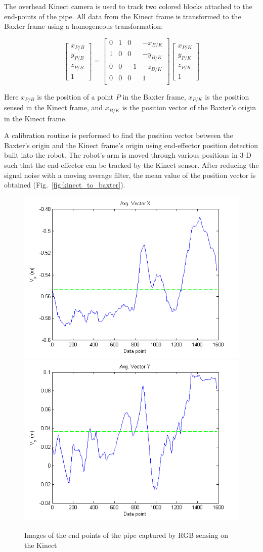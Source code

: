 \documentclass[runningheads,letterpaper]{llncs}
\begin{document}
The overhead Kinect camera is used to track two colored blocks attached to the end-points of the pipe. All data from the Kinect frame is transformed to the Baxter frame using a homogeneous transformation:

\begin{equation}
\left[ \begin{array}{c} x_{P/B} \\ y_{P/B} \\ z_{P/B} \\ 1 \end{array} \right] = \begin{bmatrix} 0 & 1 & 0 & -x_{B/K} \\ 1 & 0 & 0 & -y_{B/K} \\ 0 & 0 & -1 & -z_{B/K} \\ 0 & 0 & 0 & 1 \\ \end{bmatrix} \left[ \begin{array}{c} x_{P/K} \\ y_{P/K} \\ z_{P/K} \\ 1 \end{array} \right]
\end{equation}

Here $x_{P/B}$ is the position of a point $P$ in the Baxter frame, $x_{P/K}$ is the position sensed in the Kinect frame, and $x_{B/K}$ is the position vector of the Baxter's origin in the Kinect frame.

A calibration routine is performed to find the position vector between the Baxter's origin and the Kinect frame's origin using end-effector position detection built into the robot. The robot's arm is moved through various positions in 3-D such that the end-effector can be tracked by the Kinect sensor. After reducing the signal noise with a moving average filter, the mean value of the position vector is obtained (Fig.~\ref{fig:kinect_to_baxter}).

\begin{figure}[ht]
\centering
	\includegraphics[height=0.3\columnwidth]{images/vec_avg_x.png}
	\includegraphics[height=0.3\columnwidth]{images/vec_avg_y.png}	
\caption{Images of the end points of the pipe captured by RGB sensing on the Kinect}
\label{fig:kinect_rgb}
\end{figure}
\end{document}
